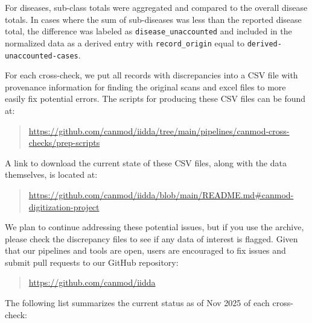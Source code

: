 \documentclass[12pt]{article}
\begin{document}
For diseases, sub-class totals were aggregated and compared to the overall disease totals. In cases where the sum of sub-diseases was less than the reported disease total, the difference was labeled as \texttt{disease\_unaccounted} and included in the normalized data as a derived entry with \texttt{record\_origin} equal to \texttt{derived-unaccounted-cases}.

For each cross-check, we put all records with discrepancies into a CSV file with provenance information for finding the original scans and excel files to more easily fix potential errors. The scripts for producing these CSV files can be found at:
\begin{quote}
  \url{https://github.com/canmod/iidda/tree/main/pipelines/canmod-cross-checks/prep-scripts}
\end{quote}
A link to download the current state of these CSV files, along with the data themselves, is located at:
\begin{quote} 
  \url{https://github.com/canmod/iidda/blob/main/README.md#canmod-digitization-project}
\end{quote}
We plan to continue addressing these potential issues, but if you use the archive, please check the discrepancy files to see if any data of interest is flagged. Given that our pipelines and tools are open, users are encouraged to fix issues and submit pull requests to our GitHub repository:
\begin{quote}
  \url{https://github.com/canmod/iidda}
\end{quote}
The following list summarizes the current status as of Nov 2025 of each cross-check:
\end{document}
